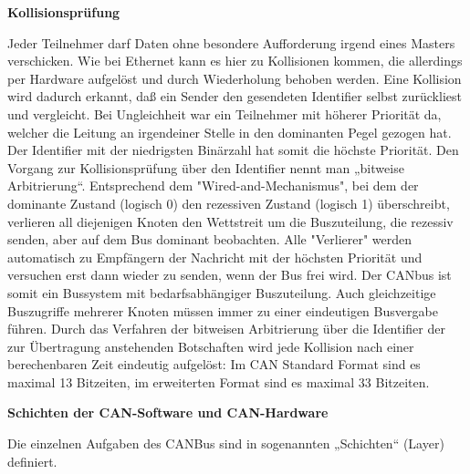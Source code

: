 \textbf{Kollisionsprüfung}

Jeder Teilnehmer darf Daten ohne besondere Aufforderung irgend eines Masters
verschicken. Wie bei Ethernet kann es hier zu Kollisionen kommen, die allerdings per
Hardware aufgelöst und durch Wiederholung behoben werden. Eine Kollision wird
dadurch erkannt, daß ein Sender den gesendeten Identifier selbst zurückliest und
vergleicht. Bei Ungleichheit war ein Teilnehmer mit höherer Priorität da, welcher die
Leitung an irgendeiner Stelle in den dominanten Pegel gezogen hat.
Der Identifier mit der niedrigsten Binärzahl hat somit die höchste Priorität.
Den Vorgang zur Kollisionsprüfung über den Identifier nennt man „bitweise Arbitrierung“.
Entsprechend dem "Wired-and-Mechanismus", bei dem der dominante Zustand (logisch
0) den rezessiven Zustand (logisch 1) überschreibt, verlieren all diejenigen Knoten den
Wettstreit um die Buszuteilung, die rezessiv senden, aber auf dem Bus dominant
beobachten. Alle "Verlierer" werden automatisch zu Empfängern der Nachricht mit der
höchsten Priorität und versuchen erst dann wieder zu senden, wenn der Bus frei wird.
Der CANbus ist somit ein Bussystem mit bedarfsabhängiger Buszuteilung.
Auch gleichzeitige Buszugriffe mehrerer Knoten müssen immer zu einer eindeutigen
Busvergabe führen. Durch das Verfahren der bitweisen Arbitrierung über die Identifier der
zur Übertragung anstehenden Botschaften wird jede Kollision nach einer berechenbaren
Zeit eindeutig aufgelöst: Im CAN Standard Format sind es maximal 13 Bitzeiten, im
erweiterten Format sind es maximal 33 Bitzeiten.

\textbf{Schichten der CAN-Software und CAN-Hardware}

Die einzelnen Aufgaben des CANBus sind in sogenannten „Schichten“ (Layer) definiert.

